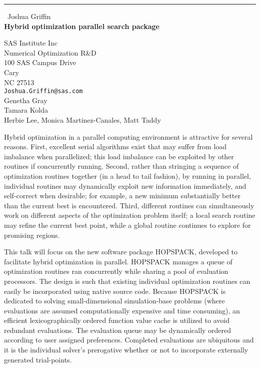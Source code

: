 \documentclass{report}
\begin{document}
\begin{center}
\rule{6in}{1pt} \
{\large Joshua Griffin \\
{\bf Hybrid optimization parallel search package}}

SAS Institute Inc \\ Numerical Optimization R&D \\ 100 SAS Campus Drive \\ Cary \\ NC 27513
\\
{\tt Joshua.Griffin@sas.com}\\
Genetha Gray\\
Tamara Kolda\\
	Herbie Lee, Monica Martinez-Canales, Matt Taddy
	\end{center}

Hybrid optimization in a parallel computing environment is attractive for
several reasons. First, excellent serial algorithms exist that may suffer
from load imbalance when parallelized; this load imbalance can be
exploited by other routines if concurrently running. Second, rather than
stringing a sequence of optimization routines together (in a head to tail
fashion), by running in parallel, individual routines may dynamically
exploit new information immediately, and self-correct when desirable; for
example, a new minimum substantially better than the current best is
encountered. Third, different routines can simultaneously work on
different aspects of the optimization problem itself; a local search
routine may refine the current best point, while a global routine
continues to explore for promising regions.

This talk will focus on the new software package HOPSPACK, developed to
facilitate hybrid optimization in parallel. HOPSPACK manages a queue of
optimization routines ran concurrently while sharing a pool of evaluation
processors. The design is such that existing individual optimization
routines can easily be incorporated using native source code. Because
HOPSPACK is dedicated to solving small-dimensional simulation-base
problems (where evaluations are assumed computationally expensive and
time consuming), an efficient lexicographically ordered function value
cache is utilized to avoid redundant evaluations. The evaluation queue
may be dynamically ordered according to user assigned preferences.
Completed evaluations are ubiquitous and it is the individual solver's
prerogative whether or not to incorporate externally generated
trial-points.
\end{document}
